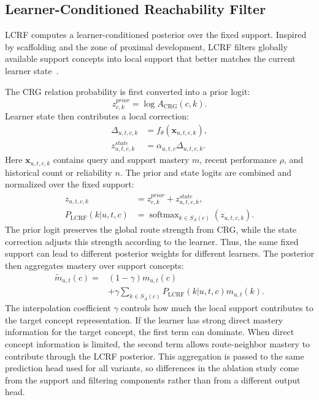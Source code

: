 \documentclass[conference]{IEEEtran}
\begin{document}
\subsection{Learner-Conditioned Reachability Filter}
LCRF computes a learner-conditioned posterior over the fixed support. Inspired by scaffolding and the zone of proximal development, LCRF filters globally available support concepts into local support that better matches the current learner state~\cite{vygotsky1978mind,wood1976tutoring}.

The CRG relation probability is first converted into a prior logit:
\[
z^{prior}_{c,k}=\log A_{\mathrm{CRG}}(c,k).
\]
Learner state then contributes a local correction:
\[
\begin{aligned}
\Delta_{u,t,c,k}&=f_{\theta}(\mathbf{x}_{u,t,c,k}),\\
z^{state}_{u,t,c,k}&=\alpha_{u,t,c}\Delta_{u,t,c,k}.
\end{aligned}
\]
Here \(\mathbf{x}_{u,t,c,k}\) contains query and support mastery \(m\), recent performance \(\rho\), and historical count or reliability \(n\). The prior and state logits are combined and normalized over the fixed support:
\[
\begin{aligned}
z_{u,t,c,k}
&=z^{prior}_{c,k}+z^{state}_{u,t,c,k},\\
P_{\mathrm{LCRF}}(k|u,t,c)
&=\operatorname{softmax}_{k\in S_A(c)}(z_{u,t,c,k}).
\end{aligned}
\]
The prior logit preserves the global route strength from CRG, while the state correction adjusts this strength according to the learner. Thus, the same fixed support can lead to different posterior weights for different learners.
The posterior then aggregates mastery over support concepts:
\[
\begin{aligned}
\tilde{m}_{u,t}(c)=&
(1-\gamma)m_{u,t}(c)\\
&+\gamma
\sum_{k\in S_A(c)}
P_{\mathrm{LCRF}}(k|u,t,c)m_{u,t}(k).
\end{aligned}
\]
The interpolation coefficient \(\gamma\) controls how much the local support contributes to the target concept representation. If the learner has strong direct mastery information for the target concept, the first term can dominate. When direct concept information is limited, the second term allows route-neighbor mastery to contribute through the LCRF posterior. This aggregation is passed to the same prediction head used for all variants, so differences in the ablation study come from the support and filtering components rather than from a different output head.
\end{document}
